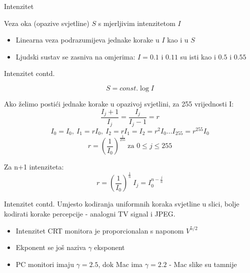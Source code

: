 \documentclass[9pt]{beamer}
\begin{document}
\begin{frame}{Intenzitet}
	
	
	\begin{block}{Veza oka (opazive svjetline)  $S$ s mjerljivim intenzitetom $I$}
		\begin{itemize}
			\item Linearna veza podrazumijeva jednake korake u $I$ kao i u $S$
			\item Ljudski sustav se zasniva na omjerima: $I=0.1$ i $0.11$ su isti kao i $0.5$ i $0.55$
		\end{itemize}
	\end{block}
\end{frame}
\begin{frame}{Intenzitet contd.}
	
	\[S = const. \log{I}\]
	
	
	Ako želimo postići jednake korake u opazivoj svjetlini, za 255 vrijednosti I:
	\[\frac{I_{j}+1}{I_{j}}=\frac{I_{j}}{I_{j}-1}=r\]
	\[I_{0}=I_{0},\ I_{1}=rI_{0}, \ I_{2}=rI_{1}=I_{2}=r^{2}I_{0}\ldots I_{255}=r^{255}I_{0}\]
	\[r=\left (\frac{1}{I_{0}}\right )^{\frac{1}{255}}\ \textrm{za } 0\leq j \leq 255\]
	
	Za n+1 intenziteta:
	\[r=\left (\frac{1}{I_{0}}\right )^{\frac{1}{n}}\ I_{j}=I_{0}^{n-\frac{j}{n}}\]
\end{frame}

\begin{frame}{Intenzitet contd.}
	Umjesto kodiranja uniformnih koraka svjetline u slici, bolje kodirati korake percepcije - analogni TV signal i JPEG.
	\begin{itemize}
		\item Intenzitet CRT monitora je proporcionalan s naponom $V^{5/2}$ 
		\item Ekponent se još naziva $\gamma$ eksponent
		\item PC monitori imaju $\gamma = 2.5$, dok Mac ima $\gamma = 2.2$ - Mac slike su tamnije
	\end{itemize}
	
\end{frame}
\end{document}

